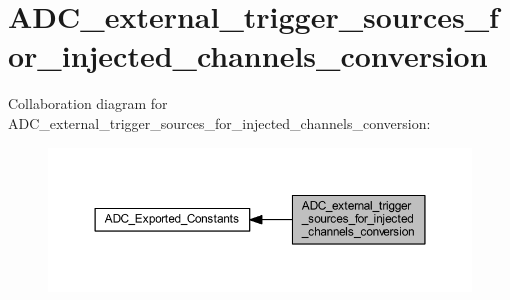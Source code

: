 \hypertarget{group___a_d_c__external__trigger__sources__for__injected__channels__conversion}{}\section{A\+D\+C\+\_\+external\+\_\+trigger\+\_\+sources\+\_\+for\+\_\+injected\+\_\+channels\+\_\+conversion}
\label{group___a_d_c__external__trigger__sources__for__injected__channels__conversion}
Collaboration diagram for A\+D\+C\+\_\+external\+\_\+trigger\+\_\+sources\+\_\+for\+\_\+injected\+\_\+channels\+\_\+conversion\+:
\nopagebreak
\begin{figure}[H]
\begin{center}
\leavevmode
\includegraphics[width=350pt]{group___a_d_c__external__trigger__sources__for__injected__channels__conversion}
\end{center}
\end{figure}
